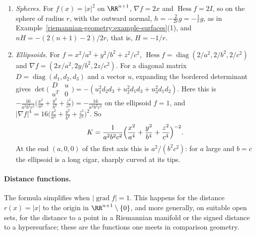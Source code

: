 \begin{example}\label{riemannian-geometry:example-level-sets}
\begin{enumerate}
\item \emph{Spheres.} For $f(x) = |x|^2$ on $\RR^{n+1}$, $\nabla f = 2x$ and $\operatorname{Hess}f = 2I$, so on the sphere of radius $r$, with the outward normal, $h = -\frac{2}{2r}g = -\frac1rg$, as in
Example~\ref{riemannian-geometry:example-surfaces}(1), and $nH = -(2(n+1) - 2)/2r$, that is, $H = -1/r$.
\item \emph{Ellipsoids.} For $f = x^2/a^2 + y^2/b^2 + z^2/c^2$, $\operatorname{Hess}f = \operatorname{diag}(2/a^2, 2/b^2, 2/c^2)$ and $\nabla f = (2x/a^2, 2y/b^2, 2z/c^2)$. For a diagonal matrix
$D = \operatorname{diag}(d_1, d_2, d_3)$ and a vector $u$, expanding the bordered determinant gives $\det\bigl(\begin{smallmatrix}D & u\\ u^T & 0\end{smallmatrix}\bigr) = -(u_1^2d_2d_3 + u_2^2d_1d_3 + u_3^2d_1d_2)$. Here this is
$-\frac{16}{a^2b^2c^2}\bigl(\frac{x^2}{a^2} + \frac{y^2}{b^2} + \frac{z^2}{c^2}\bigr) = -\frac{16}{a^2b^2c^2}$ on the ellipsoid $f = 1$, and $|\nabla f|^4 = 16\bigl(\frac{x^2}{a^4} + \frac{y^2}{b^4} + \frac{z^2}{c^4}\bigr)^2$. So
\[
K = \frac{1}{a^2b^2c^2}\Bigl(\frac{x^2}{a^4} + \frac{y^2}{b^4} + \frac{z^2}{c^4}\Bigr)^{-2} .
\]
At the end $(a, 0, 0)$ of the first axis this is $a^2/(b^2c^2)$: for $a$ large and $b = c$ the ellipsoid is a long cigar, sharply curved at its tips.
\end{enumerate}
\end{example}

\paragraph{Distance functions.} The formula simplifies when $|\operatorname{grad}f| = 1$. This happens for the distance $r(x) = |x|$ to the origin in $\RR^{n+1} \setminus \{0\}$, and more generally, on suitable open
sets, for the distance to a point in a Riemannian manifold or the signed distance to a hypersurface; these are the functions one meets in comparison geometry.


